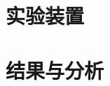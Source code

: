 \documentclass[aps,pre,12pt,preprint,%
	onecolumn,showpacs,showkeys,nofootinbib]{revtex4-2}
\begin{document}
\section{实验装置}

\section{结果与分析}
%	
%	
\end{document}
